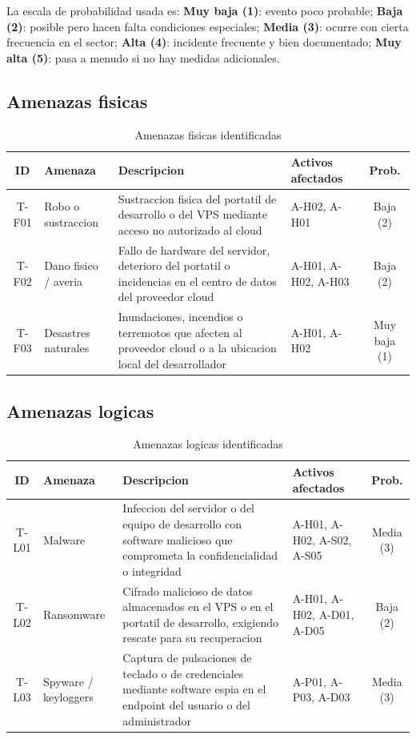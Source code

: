 \documentclass[11pt, a4paper]{article}
\begin{document}
La escala de probabilidad usada es: \textbf{Muy baja (1)}: evento poco probable; \textbf{Baja (2)}: posible pero hacen falta condiciones especiales; \textbf{Media (3)}: ocurre con cierta frecuencia en el sector; \textbf{Alta (4)}: incidente frecuente y bien documentado; \textbf{Muy alta (5)}: pasa a menudo si no hay medidas adicionales.

\subsection{Amenazas fisicas}

\begin{table}[H]
\centering
\renewcommand{\arraystretch}{1.4}
\small
\begin{tabular}{|c|l|p{4.5cm}|l|c|}
\hline
\textbf{ID} & \textbf{Amenaza} & \textbf{Descripcion} & \textbf{Activos afectados} & \textbf{Prob.} \\
\hline
T-F01 & Robo o sustraccion & Sustraccion fisica del portatil de desarrollo o del VPS mediante acceso no autorizado al cloud & A-H02, A-H01 & Baja (2) \\
\hline
T-F02 & Dano fisico / averia & Fallo de hardware del servidor, deterioro del portatil o incidencias en el centro de datos del proveedor cloud & A-H01, A-H02, A-H03 & Baja (2) \\
\hline
T-F03 & Desastres naturales & Inundaciones, incendios o terremotos que afecten al proveedor cloud o a la ubicacion local del desarrollador & A-H01, A-H02 & Muy baja (1) \\
\hline
\end{tabular}
\caption{Amenazas fisicas identificadas}
\label{tab:amenazas-fisicas}
\end{table}

\subsection{Amenazas logicas}

\begin{table}[H]
\centering
\renewcommand{\arraystretch}{1.4}
\small
\begin{tabular}{|c|l|p{4.5cm}|l|c|}
\hline
\textbf{ID} & \textbf{Amenaza} & \textbf{Descripcion} & \textbf{Activos afectados} & \textbf{Prob.} \\
\hline
T-L01 & Malware & Infeccion del servidor o del equipo de desarrollo con software malicioso que comprometa la confidencialidad o integridad & A-H01, A-H02, A-S02, A-S05 & Media (3) \\
\hline
T-L02 & Ransomware & Cifrado malicioso de datos almacenados en el VPS o en el portatil de desarrollo, exigiendo rescate para su recuperacion & A-H01, A-H02, A-D01, A-D05 & Baja (2) \\
\hline
T-L03 & Spyware / keyloggers & Captura de pulsaciones de teclado o de credenciales mediante software espia en el endpoint del usuario o del administrador & A-P01, A-P03, A-D03 & Media (3) \\
\hline
\end{tabular}
\caption{Amenazas logicas identificadas}
\label{tab:amenazas-logicas}
\end{table}
\end{document}
